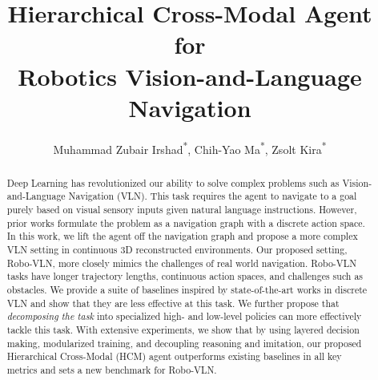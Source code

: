 \documentclass[letter, 10pt, conference]{ieeeconf}
\begin{document}
\title{\LARGE \bf Hierarchical Cross-Modal Agent for \\Robotics Vision-and-Language Navigation}
\author{Muhammad Zubair Irshad\textsuperscript{*}, Chih-Yao Ma\textsuperscript{*}\textsuperscript{}, Zsolt Kira\textsuperscript{*}
}



\begin{comment}
Recently proposed navigation graph based discrete VLN settings become a poor proxy for real-world robotics navigation.
\end{comment}
  

\begin{abstract}
Deep Learning has revolutionized our ability to solve complex problems such as Vision-and-Language Navigation (VLN). This task requires the agent to navigate to a goal purely based on visual sensory inputs given natural language instructions. However, prior works formulate the problem as a navigation graph with a discrete action space. In this work, we lift the agent off the navigation graph and propose a more complex VLN setting in continuous 3D reconstructed environments. Our proposed setting, Robo-VLN, more closely mimics the challenges of real world navigation. Robo-VLN tasks have longer trajectory lengths, continuous action spaces, and challenges such as obstacles. We provide a suite of baselines inspired by state-of-the-art works in discrete VLN and show that they are less effective at this task. We further propose that \textit{decomposing the task} into specialized high- and low-level policies can more effectively tackle this task. With extensive experiments, we show that by using layered decision making, modularized training, and decoupling reasoning and imitation, our proposed Hierarchical Cross-Modal (HCM) agent outperforms existing baselines in all key metrics and sets a new benchmark for Robo-VLN.
\end{abstract}
\end{document}
